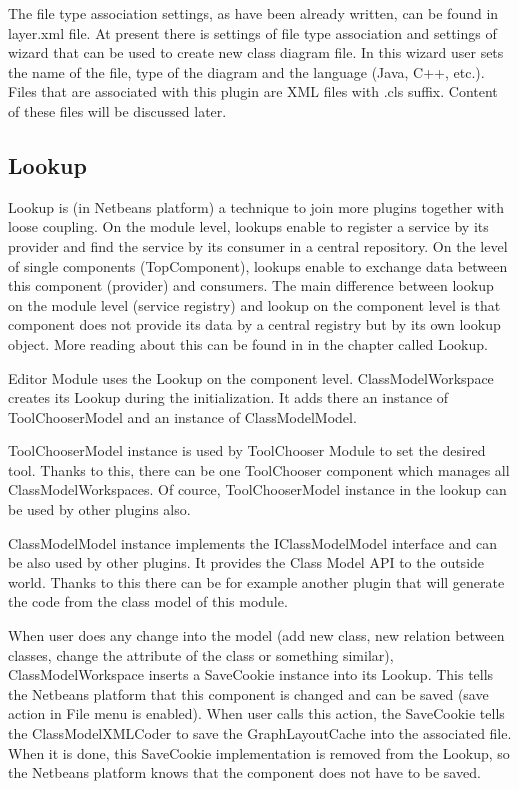The file type association settings, as have been already written, can be found in layer.xml file. At present there is settings of file type association and settings of wizard that can be used to create new class diagram file. In this wizard user sets the name of the file, type of the diagram and the language (Java, C++, etc.). Files that are associated with this plugin are XML files with .cls suffix. Content of these files will be discussed later.

\subsection{Lookup}
\label{subsection:lookup}

Lookup is (in Netbeans platform) a technique to join more plugins together with loose coupling. On the module level, lookups enable to register a service by its provider and find the service by its consumer in a central repository. On the level of single components (TopComponent), lookups enable to exchange data between this component (provider) and consumers. The main difference between lookup on the module level (service registry) and lookup on the component level is that component does not provide its data by a central registry but by its own lookup object. More reading about this can be found in \cite{netbeans6.9DevGuide} in the chapter called Lookup.

Editor Module uses the Lookup on the component level. ClassModelWorkspace creates its Lookup during the initialization. It adds there an instance of ToolChooserModel and an instance of ClassModelModel.

ToolChooserModel instance is used by ToolChooser Module to set the desired tool. Thanks to this, there can be one ToolChooser component which manages all ClassModelWorkspaces. Of cource, ToolChooserModel instance in the lookup can be used by other plugins also.

ClassModelModel instance implements the IClassModelModel interface and can be also used by other plugins. It provides the Class Model API to the outside world. Thanks to this there can be for example another plugin that will generate the code from the class model of this module.

When user does any change into the model (add new class, new relation between classes, change the attribute of the class or something similar), ClassModelWorkspace inserts a SaveCookie instance into its Lookup. This tells the Netbeans platform that this component is changed and can be saved (save action in File menu is enabled). When user calls this action, the SaveCookie tells the ClassModelXMLCoder to save the GraphLayoutCache into the associated file. When it is done, this SaveCookie implementation is removed from the Lookup, so the Netbeans platform knows that the component does not have to be saved.

